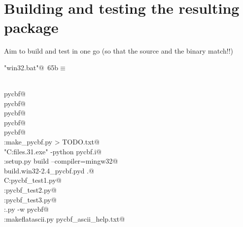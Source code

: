 \documentclass[10pt,a4paper,twoside,notitlepage]{article}
\begin{document}
\section{Building and testing the resulting package}

Aim to build and test in one go (so that the source and the binary match!!)

\begin{flushleft} \small
\begin{minipage}{\linewidth}\label{scrap10}\raggedright\small
{} \verb@"win32.bat"@\nobreak\ {\footnotesize {65b}}$\equiv$
\vspace{-1ex}
\begin{list}{}{} \item
\mbox{}\verb@@\\
\mbox{}\verb@nuweb pycbf@\\
\mbox{}\verb@pdflatex pycbf@\\
\mbox{}\verb@pdflatex pycbf@\\
\mbox{}\verb@nuweb pycbf@\\
\mbox{}\verb@pdflatex pycbf@\\
\mbox{}\verb@C:\python make_pycbf.py > TODO.txt@\\
\mbox{}\verb@"C:\program files.31\swig.exe" -python pycbf.i@\\
\mbox{}\verb@C:\python setup.py build --compiler=mingw32@\\
\mbox{}\verb@copy build\lib.win32-2.4\_pycbf.pyd .@\\
\mbox{}\verb@REM C:\python pycbf_test1.py@\\
\mbox{}\verb@C:\python pycbf_test2.py@\\
\mbox{}\verb@C:\python pycbf_test3.py@\\
\mbox{}\verb@C:\lib\pydoc.py -w pycbf@\\
\mbox{}\verb@C:\python makeflatascii.py pycbf_ascii_help.txt@\\
\mbox{}\verb@@{\NWsep}
\end{list}
\vspace{-1.5ex}
\footnotesize
\begin{list}{}{\setlength{\itemsep}{-\parsep}\setlength{\itemindent}{-\leftmargin}}

\item{}
\end{list}
\end{minipage}\vspace{4ex}
\end{flushleft}
\end{document}
